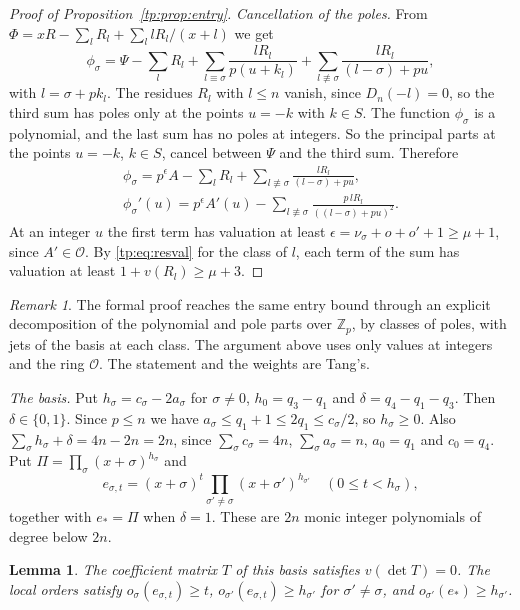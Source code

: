 \documentclass[11pt]{amsart}
\newtheorem{lemma}[theorem]{Lemma}
\theoremstyle{definition}
\theoremstyle{remark}
\newtheorem{remark}[theorem]{Remark}
\numberwithin{equation}{section}
\newcommand{\Z}{\mathbb Z}
\begin{document}
\begin{proof}[Proof of Proposition~\ref{tp:prop:entry}]
\emph{Cancellation of the poles.} From $\Phi=xR-\sum_lR_l+\sum_llR_l/(x+l)$ we get
\[
 \phi_\sigma=\Psi-\sum_lR_l+\sum_{l\equiv\sigma}\frac{lR_l}{p(u+k_l)}+\sum_{l\not\equiv\sigma}\frac{lR_l}{(l-\sigma)+pu},
\]
with $l=\sigma+pk_l$. The residues $R_l$ with $l\le n$ vanish, since $D_n(-l)=0$, so the third sum has poles only at
the points $u=-k$ with $k\in S$. The function $\phi_\sigma$ is a polynomial, and the last sum has no poles at integers. So the
principal parts at the points $u=-k$, $k\in S$, cancel between $\Psi$ and the third sum. Therefore
\begin{gather*}
 \phi_\sigma=p^{\epsilon}A-\sum_lR_l+\sum_{l\not\equiv\sigma}\frac{lR_l}{(l-\sigma)+pu},\\
 \phi_\sigma'(u)=p^\epsilon A'(u)-\sum_{l\not\equiv\sigma}\frac{p\,lR_l}{((l-\sigma)+pu)^2}.
\end{gather*}
At an integer $u$ the first term has valuation at least $\epsilon=\nu_\sigma+o+o'+1\ge\mu+1$, since $A'\in\mathcal O$.
By \eqref{tp:eq:resval} for the class of $l$, each term of the sum has valuation at least
$1+v(R_l)\ge\mu+3$.
\end{proof}

\begin{remark}\label{tp:rem:medium}
The formal proof reaches the same entry bound through an explicit decomposition of the polynomial and pole parts over
$\Z_p$, by classes of poles, with jets of the basis at each class. The argument above uses only values at integers and
the ring $\mathcal O$. The statement and the weights are Tang's.
\end{remark}

\emph{The basis.} Put $h_\sigma=c_\sigma-2a_\sigma$ for $\sigma\ne0$, $h_0=q_3-q_1$ and $\delta=q_4-q_1-q_3$. Then
$\delta\in\{0,1\}$. Since $p\le n$ we have $a_\sigma\le q_1+1\le2q_1\le c_\sigma/2$, so $h_\sigma\ge0$. Also
$\sum_\sigma h_\sigma+\delta=4n-2n=2n$, since $\sum_\sigma c_\sigma=4n$, $\sum_\sigma a_\sigma=n$, $a_0=q_1$ and
$c_0=q_4$. Put $\Pi=\prod_\sigma(x+\sigma)^{h_\sigma}$ and
\[
 e_{\sigma,t}=(x+\sigma)^t\prod_{\sigma'\ne\sigma}(x+\sigma')^{h_{\sigma'}}\quad(0\le t<h_\sigma),
\]
together with $e_*=\Pi$ when $\delta=1$. These are $2n$ monic integer polynomials of degree below $2n$.

\begin{lemma}\label{tp:lem:basis}
The coefficient matrix $T$ of this basis satisfies $v(\det T)=0$. The local orders satisfy
$o_\sigma(e_{\sigma,t})\ge t$, $o_{\sigma'}(e_{\sigma,t})\ge h_{\sigma'}$ for $\sigma'\ne\sigma$, and
$o_{\sigma'}(e_*)\ge h_{\sigma'}$.
\end{lemma}
\end{document}
